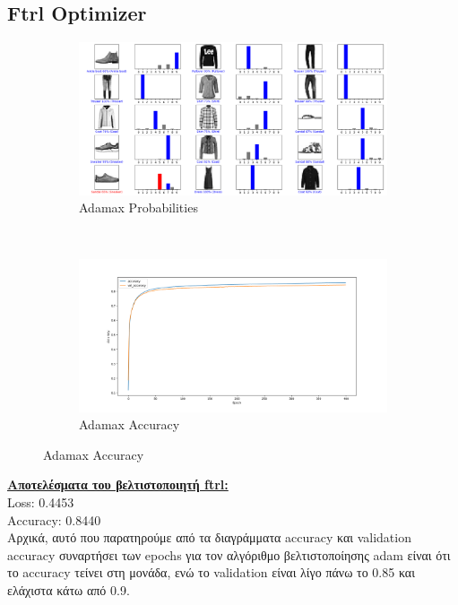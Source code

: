 \documentclass{article}
\begin{document}
\subsection*{Ftrl Optimizer}
	\begin{figure}[h!]
		\centering
		\begin{subfigure}[t]{0.5\textwidth}
			\centering
			\includegraphics[width=\linewidth]{../exercise3_3/images/fashion_ftrl_probabilities.png}
			\caption{Adamax Probabilities}
		\end{subfigure}%
		~
		\begin{subfigure}[t]{0.5\textwidth}
			\centering
			\includegraphics[width=\linewidth]{../exercise3_3/images/fashion_ftrl_accuracy.png}
			\caption{Adamax Accuracy}
		\end{subfigure}
	\end{figure}
	\noindent
	\textbf{\underline{Aποτελέσματα του βελτιστοποιητή ftrl:}}\\
	Loss: 0.4453 \\
	Αccuracy: 0.8440\\

	\noindent
	Αρχικά, αυτό που παρατηρούμε από τα διαγράμματα accuracy και validation accuracy συναρτήσει των epochs για τον αλγόριθμο βελτιστοποίησης adam είναι ότι το accuracy τείνει στη μονάδα, ενώ το validation είναι λίγο πάνω το 0.85 και ελάχιστα κάτω  από 0.9.\\
	 
\end{document}
